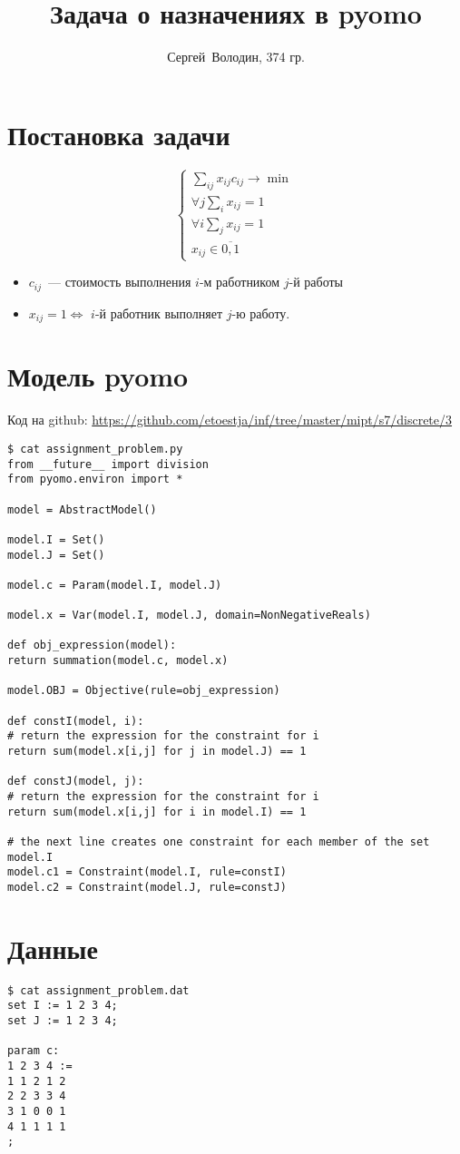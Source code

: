 \documentclass[a4paper]{article}
\title{Задача о назначениях в pyomo}
\author{Сергей~Володин, 374 гр.}
\begin{document}
\maketitle
\section*{Постановка задачи}
$$\begin{cases}
\sum\limits_{ij} x_{ij}c_{ij}\to\min\\
\forall j \sum\limits_i x_{ij}=1\\
\forall i \sum\limits_j x_{ij}=1\\
x_{ij}\in\overline{0,1}
\end{cases}$$

\begin{itemize}
\item $c_{ij}$~--- стоимость выполнения $i$-м работником $j$-й работы
\item  $x_{ij}=1\Leftrightarrow$ $i$-й работник выполняет $j$-ю работу.
\end{itemize}
\section*{Модель pyomo}
Код на github: \url{https://github.com/etoestja/inf/tree/master/mipt/s7/discrete/3}
\begin{verbatim}
$ cat assignment_problem.py
from __future__ import division
from pyomo.environ import *

model = AbstractModel()

model.I = Set()
model.J = Set()

model.c = Param(model.I, model.J)

model.x = Var(model.I, model.J, domain=NonNegativeReals)

def obj_expression(model):
return summation(model.c, model.x)

model.OBJ = Objective(rule=obj_expression)

def constI(model, i):
# return the expression for the constraint for i
return sum(model.x[i,j] for j in model.J) == 1

def constJ(model, j):
# return the expression for the constraint for i
return sum(model.x[i,j] for i in model.I) == 1

# the next line creates one constraint for each member of the set model.I
model.c1 = Constraint(model.I, rule=constI)
model.c2 = Constraint(model.J, rule=constJ)
\end{verbatim}
\section*{Данные}
\begin{verbatim}
$ cat assignment_problem.dat
set I := 1 2 3 4;
set J := 1 2 3 4;

param c:
1 2 3 4 :=
1 1 2 1 2
2 2 3 3 4
3 1 0 0 1
4 1 1 1 1
;
\end{verbatim}
\end{document}
